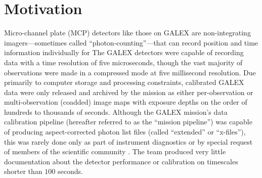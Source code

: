 \documentclass[trackchanges,preprint2]{aastex}
\begin{document}

\section{Motivation}
\label{motivation}
Micro-channel plate (MCP) detectors like those on GALEX are non-integrating imagers---sometimes called ``photon-counting''---that can record position and time information individually for  The GALEX detectors were capable of recording data with a time resolution of five microseconds, though the vast majority of observations were made in a compressed mode at five millisecond resolution. Due primarily to computer storage and processing constraints, calibrated GALEX data were only released and archived by the mission as either per-observation or multi-observation (coadded) image maps with exposure depths on the order of hundreds to thousands of seconds. Although the GALEX mission's data calibration pipeline (hereafter referred to as the ``mission pipeline'') was capable of producing aspect-corrected photon list files (called ``extended'' or ``x-files''), this was rarely done only as part of instrument diagnostics or by special request of members of the scientific community \citep{rob2005, wel2006, wel2007}. The team produced very little documentation about the detector performance or calibration on timescales shorter than $100$ seconds.
\end{document}
